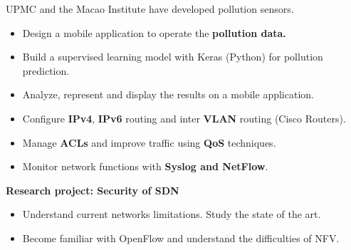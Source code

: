 \documentclass[10pt,a4paper]{.altacv}
\begin{document}
\divider

UPMC and the Macao Institute have developed pollution sensors.
\begin{itemize}
	\item Design a mobile application to operate the \textbf {pollution data.}
	\item Build a supervised learning model with Keras (Python) for pollution prediction.
	\item Analyze, represent and display the results on a mobile application.
\end{itemize}

\divider

	

\begin{itemize}
	\item Configure \textbf {IPv4}, \textbf {IPv6} routing and inter \textbf {VLAN} routing (Cisco Routers).
	\item Manage \textbf {ACLs} and improve traffic using \textbf {QoS} techniques.
	\item Monitor network functions with \textbf {Syslog and NetFlow}.
\end{itemize}


\textbf{\large Research project: Security of SDN}
\medskip
\begin{itemize}
	\item Understand current networks limitations. Study the state of the art.
	\item Become familiar with OpenFlow and understand the difficulties of NFV.
\end{itemize}
\end{document}
